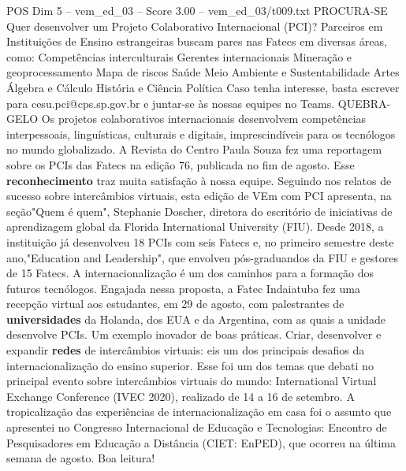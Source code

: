 \begin{textsample}{POS Dim 5 – vem\_ed\_03 – Score 3.00 – vem\_ed\_03/t009.txt}  \label{ex:f5_pos_056}
PROCURA-SE Quer desenvolver um Projeto Colaborativo Internacional (PCI)?
Parceiros em Instituições de Ensino estrangeiras buscam pares nas Fatecs em diversas áreas, como: Competências interculturais Gerentes internacionais Mineração e geoprocessamento Mapa de riscos Saúde Meio Ambiente e Sustentabilidade Artes Álgebra e Cálculo História e Ciência Política Caso tenha interesse, basta escrever para cesu.pci@cps.sp.gov.br e juntar-se às nossas equipes no Teams.
QUEBRA-GELO Os projetos colaborativos internacionais desenvolvem competências interpessoais, linguísticas, culturais e digitais, imprescindíveis para os tecnólogos no mundo globalizado.
A Revista do Centro Paula Souza fez uma reportagem sobre os PCIs das Fatecs na edição 76, publicada no fim de agosto.
Esse \textbf{reconhecimento} traz muita satisfação à nossa equipe.
Seguindo nos relatos de sucesso sobre intercâmbios virtuais, esta edição de VEm com PCI apresenta, na seção"Quem é quem", Stephanie Doscher, diretora do escritório de iniciativas de aprendizagem global da Florida International University (FIU).
Desde 2018, a instituição já desenvolveu 18 PCIs com seis Fatecs e, no primeiro semestre deste ano,"Education and Leadership", que envolveu pós-graduandos da FIU e gestores de 15 Fatecs.
A internacionalização é um dos caminhos para a formação dos futuros tecnólogos.
Engajada nessa proposta, a Fatec Indaiatuba fez uma recepção virtual aos estudantes, em 29 de agosto, com palestrantes de \textbf{universidades} da Holanda, dos EUA e da Argentina, com as quais a unidade desenvolve PCIs.
Um exemplo inovador de boas práticas.
Criar, desenvolver e expandir \textbf{redes} de intercâmbios virtuais: eis um dos principais desafios da internacionalização do ensino superior.
Esse foi um dos temas que debati no principal evento sobre intercâmbios virtuais do mundo: International Virtual Exchange Conference (IVEC 2020), realizado de 14 a 16 de setembro.
A tropicalização das experiências de internacionalização em casa foi o assunto que apresentei no Congresso Internacional de Educação e Tecnologias: Encontro de Pesquisadores em Educação a Distância (CIET: EnPED), que ocorreu na última semana de agosto.
Boa leitura!

\end{textsample}
